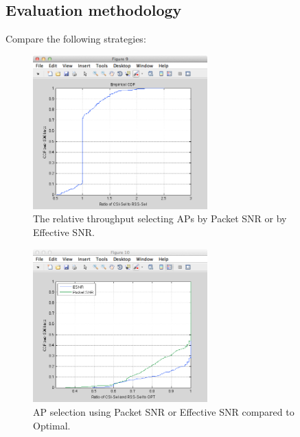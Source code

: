 \subsection{Evaluation methodology}
Compare the following strategies:
\begin{figure}[htp]
	\centering
	\includegraphics[width=0.6\textwidth]{figures/esnr/ap_sel_ratio.png}
	\caption{\label{fig:ap_sel_ratio}The relative throughput selecting APs by Packet SNR or by Effective SNR\@.}
\end{figure}

\begin{figure}[htp]
	\centering
	\includegraphics[width=0.6\textwidth]{figures/esnr/ap_sel_ratio_opt.png}
	\caption{\label{fig:ap_sel_ratio_opt}AP selection using Packet SNR or Effective SNR compared to Optimal.}
\end{figure}

